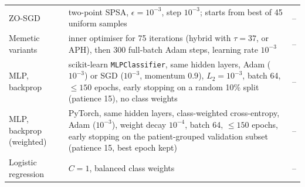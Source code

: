 \documentclass[10pt,letterpaper]{article}
\begin{document}
\begin{table}[H]
\begin{tabular}{p{2.6cm}p{8.6cm}c}
ZO-SGD & two-point SPSA, $\epsilon=10^{-3}$, step $10^{-3}$; starts from best of 45 uniform samples & -- \\
Memetic variants & inner optimiser for 75 iterations (hybrid with $\tau=37$, or APH), then 300 full-batch Adam steps, learning rate $10^{-3}$ & -- \\
MLP, backprop & scikit-learn \texttt{MLPClassifier}, same hidden layers, Adam ($10^{-3}$) or SGD ($10^{-3}$, momentum $0.9$), $L_2=10^{-3}$, batch 64, $\le150$ epochs, early stopping on a random 10\% split (patience 15), no class weights & -- \\
MLP, backprop (weighted) & PyTorch, same hidden layers, class-weighted cross-entropy, Adam ($10^{-3}$), weight decay $10^{-4}$, batch 64, $\le150$ epochs, early stopping on the patient-grouped validation subset (patience 15, best epoch kept) & -- \\
Logistic regression & $C=1$, balanced class weights & -- \\
\bottomrule
\end{tabular}
\end{table}


\nolinenumbers


\end{document}
